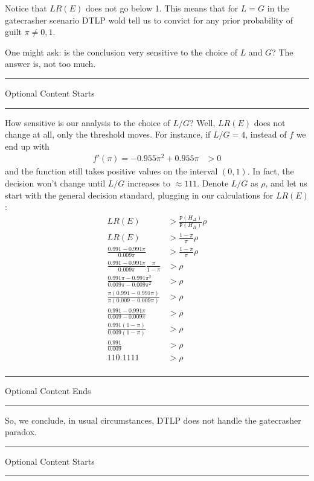 \documentclass{ifcolog}
\newcommand{\intermezzoa}{
	\begin{minipage}[c]{13cm}
	\begin{center}\rule{10cm}{0.4pt}



	\tiny{\sc Optional Content Starts}
	
	\vspace{-1mm}
	
	\rule{10cm}{0.4pt}\end{center}
	\end{minipage}\nopagebreak 
	}
\newcommand{\intermezzob}{\nopagebreak 
	\begin{minipage}[c]{13cm}
	\begin{center}\rule{10cm}{0.4pt}

	\tiny{\sc Optional Content Ends}
	
	\vspace{-1mm}
	
	\rule{10cm}{0.4pt}\end{center}
	\end{minipage}
	}
\newcommand{\pr}[1]{\mbox{$\mathtt{P}(#1)$}}
\begin{document}
\noindent Notice that $LR(E)$ does not go below 1. This means that for $L=G$ in the gatecrasher scenario DTLP wold tell us to convict for any prior probability of guilt $\pi\neq 0,1$.

One might ask: is the conclusion very sensitive to the choice of $L$ and $G$? The answer is, not too much.

\intermezzoa


 How sensitive is our analysis to the choice of $L/G$? Well, $LR(E)$ does not change at all, only the threshold moves. For instance, if $L/G=4$, instead of $f$ we end up with \begin{align*}
 f'(\pi) = - 0.955 \pi^2 + 0.955\pi &>0 
 \end{align*}
 and the function still takes positive values on the interval $(0,1)$. In fact, the decision won't change until $L/G$ increases to $\approx 111$. Denote $L/G$ as $\rho$, and let us start with the general decision standard, plugging in our calculations for $LR(E)$:
\begin{align*}
LR(E) &> \frac{\pr{H_\Delta}}{\pr{H_\Pi}} \rho\\
LR(E) &> \frac{1-\pi}{\pi} \rho \\
\frac{0.991-0.991\pi}{0.009\pi} &> \frac{1-\pi}{\pi} \rho\\
\frac{0.991-0.991\pi}{0.009\pi}\frac{\pi}{1-\pi} &>  \rho\\
\frac{0.991\pi-0.991\pi^2}{0.009\pi-0.009\pi^2} &>  \rho\\
\frac{\pi(0.991-0.991\pi)}{\pi(0.009-0.009\pi)} &>  \rho\\
\frac{0.991-0.991\pi}{0.009-0.009\pi} &>  \rho\\
\frac{0.991(1-\pi)}{0.009(1-\pi)} &>  \rho\\
\frac{0.991}{0.009} &>  \rho\\
110.1111 &>  \rho\\
\end{align*}






  

\intermezzob

 So, we conclude, in usual circumstances, DTLP does not handle the gatecrasher paradox. 



 \intermezzoa
\end{document}
